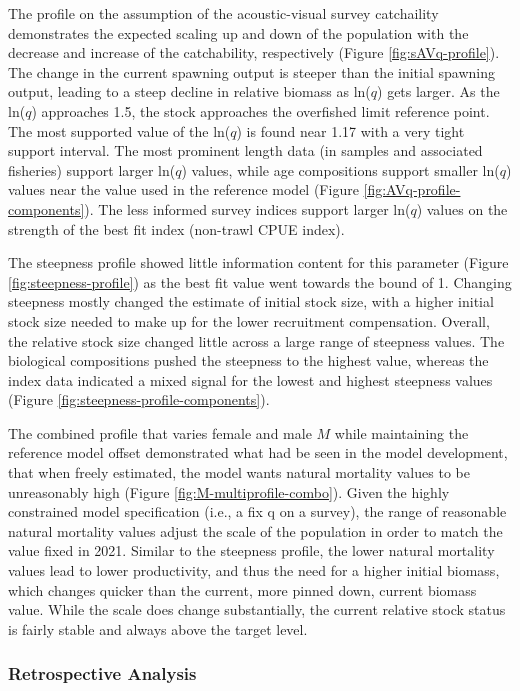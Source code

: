 \documentclass[11pt,
  english,
  letterpaper,
]{article}
\begin{document}
The profile on the assumption of the acoustic-visual survey catchaility demonstrates the expected scaling up and down of the population with the decrease and increase of the catchability, respectively (Figure \ref{fig:sAVq-profile}). The change in the current spawning output is steeper than the initial spawning output, leading to a steep decline in relative biomass as ln(\(q\)) gets larger. As the ln(\(q\)) approaches 1.5, the stock approaches the overfished limit reference point. The most supported value of the ln(\(q\)) is found near 1.17 with a very tight support interval. The most prominent length data (in samples and associated fisheries) support larger ln(\(q\)) values, while age compositions support smaller ln(\(q\)) values near the value used in the reference model (Figure \ref{fig:AVq-profile-components}). The less informed survey indices support larger ln(\(q\)) values on the strength of the best fit index (non-trawl CPUE index).

The steepness profile showed little information content for this parameter (Figure \ref{fig:steepness-profile}) as the best fit value went towards the bound of 1. Changing steepness mostly changed the estimate of initial stock size, with a higher initial stock size needed to make up for the lower recruitment compensation. Overall, the relative stock size changed little across a large range of steepness values. The biological compositions pushed the steepness to the highest value, whereas the index data indicated a mixed signal for the lowest and highest steepness values (Figure \ref{fig:steepness-profile-components}).

The combined profile that varies female and male \(M\) while maintaining the reference model offset demonstrated what had be seen in the model development, that when freely estimated, the model wants natural mortality values to be unreasonably high (Figure \ref{fig:M-multiprofile-combo}). Given the highly constrained model specification (i.e., a fix q on a survey), the range of reasonable natural mortality values adjust the scale of the population in order to match the value fixed in 2021. Similar to the steepness profile, the lower natural mortality values lead to lower productivity, and thus the need for a higher initial biomass, which changes quicker than the current, more pinned down, current biomass value. While the scale does change substantially, the current relative stock status is fairly stable and always above the target level.

\hypertarget{retrospective-analysis}{%
\subsubsection{Retrospective Analysis}\label{retrospective-analysis}}
\end{document}
